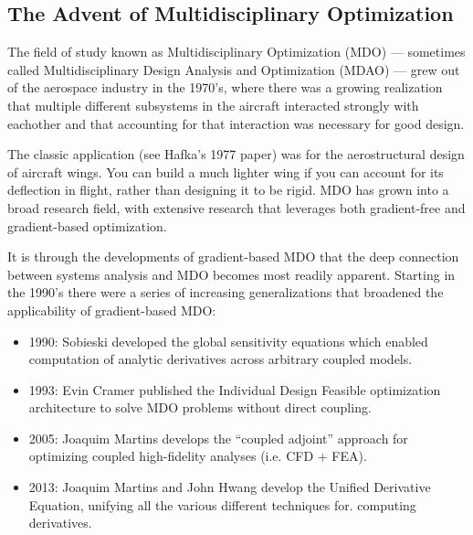 \documentclass[conf]{new-aiaa}
\begin{document}
    \subsection{The Advent of Multidisciplinary Optimization}

    The field of study known as Multidisciplinary Optimization (MDO) --- sometimes called Multidisciplinary Design Analysis and Optimization (MDAO) --- grew out of the aerospace industry in the 1970's, 
    where there was a growing realization that multiple different subsystems in the aircraft interacted strongly with eachother and that accounting for that interaction was necessary for good design. 

    The classic application (see Hafka's 1977 paper) was for the aerostructural design of aircraft wings. 
    You can build a much lighter wing if you can account for its deflection in flight, rather than designing it to be rigid. 
    MDO has grown into a broad research field, with extensive research that leverages both gradient-free and gradient-based optimization. 

    It is through the developments of gradient-based MDO that the deep connection between systems analysis and MDO becomes most readily apparent. 
    Starting in the 1990's there were a series of increasing generalizations that broadened the applicability of gradient-based MDO: 

    \begin{itemize}[itemsep=1.2em, label={}, itemindent=-2.9em]
        \item 1990: Sobieski developed the global sensitivity equations which enabled computation of analytic derivatives across arbitrary coupled models.
        \item 1993: Evin Cramer published the Individual Design Feasible optimization architecture to solve MDO problems without direct coupling.
        \item 2005: Joaquim Martins develops the ``coupled adjoint'' approach for optimizing coupled high-fidelity analyses (i.e. CFD + FEA).
        \item 2013: Joaquim Martins and John Hwang develop the Unified Derivative Equation, unifying all the various different techniques for. computing derivatives.
    \end{itemize}


\end{document}
